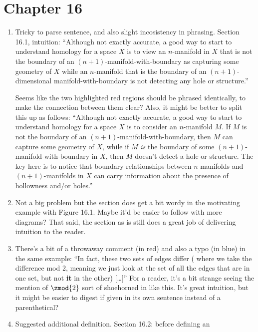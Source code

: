 \documentclass{fkletter}
\begin{document}
\section*{Chapter 16}
\begin{enumerate}
  \item Tricky to parse sentence, and also slight incosistency in phrasing.
    Section 16.1, intuition: ``Although not exactly accurate, a good way to
    start to understand homology for a space $X$ is to view an $n$-manifold in
    $X$ that is not the boundary of an
    {\color{red}$(n+1)$-manifold-with-boundary} as capturing some geometry of
    $X$ while an $n$-manifold that is the boundary of an
    {\color{red}$(n+1)$-dimensional manifold-with-boundary} is not detecting any
    hole or structure.''

    Seems like the two highlighted red regions should be phrased identically, to
    make the connection between them clear? Also, it might be better to split
    this up as follows: ``Although not exactly accurate, a good way to start to
    understand homology for a space $X$ is to consider an $n$-manifold $M$. If
    $M$ is not the boundary of an $(n+1)$-manifold-with-boundary, then $M$ can
    capture some geometry of $X$, while if $M$ \emph{is} the boundary of some
    $(n+1)$-manifold-with-boundary in $X$, then $M$ doesn't detect a hole or
    structure. The key here is to notice that boundary relationships between
    $n$-manifolds and $(n+1)$-manifolds in $X$ can carry information about the
    presence of hollowness and/or holes.''
  \item Not a big problem but the section does get a bit wordy in the motivating
    example with Figure 16.1. Maybe it'd be easier to follow with more diagrams?
    That said, the section as is still does a great job of delivering intuition
    to the reader.
  \item There's a bit of a throwaway comment (in red) and also a typo (in blue)
    in the same example: ``In fact, these two sets of edges differ ({\color{red}
      where we take the difference mod 2, meaning} we just look at the set of
    all the edges that are in one set, but not {\color{blue}\bfseries it} in the
    other) [\ldots]'' For a reader, it's a bit strange seeing the mention of
    $\zmod{2}$ sort of shoehorned in like this. It's great intuition, but it
    might be easier to digest if given in its own sentence instead of a
    parenthetical?
  \item Suggested additional definition. Section 16.2: before defining an

\end{enumerate}
\end{document}
